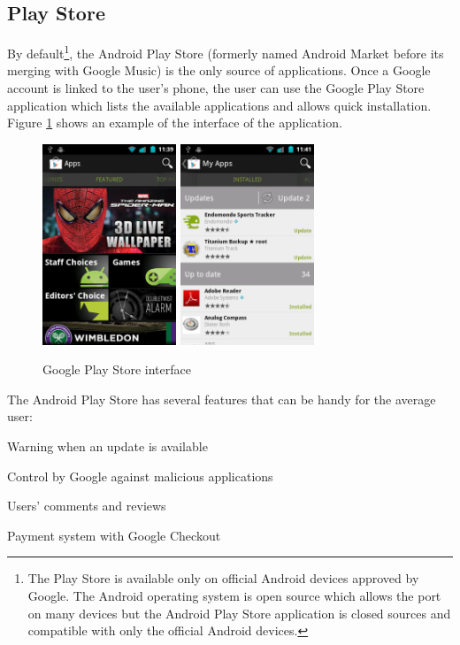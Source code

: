 \subsection{Play Store}
By default\footnote{The Play Store is available only on official Android devices approved by Google. The Android operating system is open source which allows the port on many devices but the Android Play Store application is closed sources and compatible with only the official Android devices.}, the Android Play Store (formerly named Android Market before its merging with Google Music) is the only source of applications.
Once a Google account is linked to the user's phone, the user can use the Google Play Store application which lists the available applications and allows quick installation.
Figure \ref{fig:market} shows an example of the interface of the application.\\

\begin{figure}[h]
  \centering
  \includegraphics[width=4cm]{images/market1.png}
  \includegraphics[width=4cm]{images/market2.png}
  \caption{Google Play Store interface}
  \label{fig:market}
\end{figure}

The Android Play Store has several features that can be handy for the average user:
\begin{itemizealt}
\item Warning when an update is available
\item Control by Google against malicious applications
\item Users' comments and reviews
\item Payment system with Google Checkout
\end{itemizealt}

